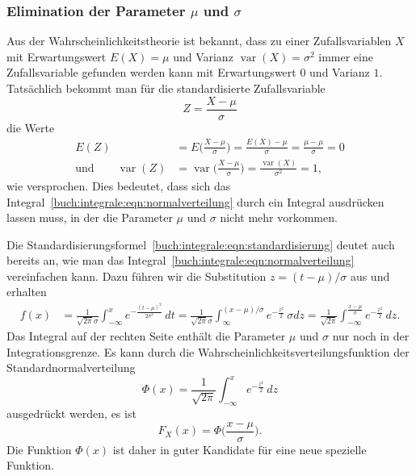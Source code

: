 \subsubsection{Elimination der Parameter $\mu$ und $\sigma$}
Aus der Wahrscheinlichkeitstheorie ist bekannt, dass zu einer
Zufallsvariablen $X$ mit Erwartungswert $E(X)=\mu$ und Varianz
$\operatorname{var}(X)=\sigma^2$ immer eine Zufallsvariable
gefunden werden kann mit Erwartungswert $0$ und Varianz $1$.
Tatsächlich bekommt man für die standardisierte Zufallsvariable
\begin{equation}
Z = \frac{X-\mu}{\sigma}
\label{buch:integrale:eqn:standardisierung}
\end{equation}
die Werte
\begin{align*}
E(Z)
&=
E\biggl(\frac{X-\mu}{\sigma}\biggr)
=
\frac{E(X)-\mu}{\sigma}
=
\frac{\mu-\mu}{\sigma}
=
0
\\
\text{und}\qquad
\operatorname{var}(Z)
&=
\operatorname{var}\biggl(\frac{X-\mu}{\sigma}\biggr)
=
\frac{\operatorname{var}(X)}{\sigma^2}
=
1,
\end{align*}
wie versprochen.
Dies bedeutet, dass sich das Integral~\ref{buch:integrale:eqn:normalverteilung}
durch ein Integral ausdrücken lassen muss, in der die Parameter $\mu$
und $\sigma$ nicht mehr vorkommen.

Die Standardisierungsformel~\eqref{buch:integrale:eqn:standardisierung}
deutet auch bereits an, wie man das
Integral~\ref{buch:integrale:eqn:normalverteilung} vereinfachen kann.
Dazu führen wir die Substitution $z=(t-\mu)/\sigma$ aus und erhalten
\begin{align*}
f(x)
&=
\frac{1}{\sqrt{2\pi}\sigma} 
\int_{-\infty}^x e^{-\frac{(t-\mu)^2}{2\sigma^2}}\,dt
=
\frac{1}{\sqrt{2\pi}\sigma}
\int_{\infty}^{(x-\mu)/\sigma}
e^{-\frac{z^2}2}\,\sigma dz
=
\frac{1}{\sqrt{2\pi}}
\int_{-\infty}^{\frac{x-\mu}{\sigma}} e^{-\frac{z^2}2}\,dz.
\end{align*}
Das Integral auf der rechten Seite enthält die Parameter $\mu$ und
$\sigma$ nur noch in der Integrationsgrenze.
Es kann durch die Wahrscheinlichkeitsverteilungsfunktion der
Standardnormalverteilung
\begin{equation}
\Phi(x) = \frac{1}{\sqrt{2\pi}} \int_{-\infty}^x e^{-\frac{z^2}2}\,dz
\label{buch:integrale:eqn:standardnormalverteilung}
\end{equation}
ausgedrückt werden, es ist
\[
F_X(x) = \Phi\biggl(\frac{x-\mu}{\sigma}\biggr).
\]
Die Funktion $\Phi(x)$ ist daher in guter Kandidate für eine neue spezielle
Funktion.

